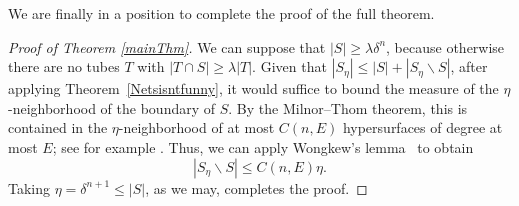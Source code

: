 \documentclass[letterpaper, reqno, 11pt]{amsart}
\theoremstyle{remark}
\numberwithin{equation}{section}
\begin{document}
We are finally in a position to complete the proof of the full theorem.




\begin{proof}[Proof of Theorem \ref{mainThm}]
 We can suppose that  $|S| \geq \lambda\delta^n$, because otherwise there are
no tubes $T$ with $|T \cap S| \geq \lambda |T|$. Given that $|S_\eta|\le |S|+ |S_{\eta} \backslash  S|$, after applying Theorem~\ref{Netsisntfunny}, it would suffice to bound the measure of  the $\eta$-neighborhood of the boundary of $S$. By the Milnor--Thom theorem,  this is contained in the $\eta$-neighborhood of at most $C(n,E)$ hypersurfaces of degree at most $E$; see for example \cite[Theorem 9]{HRR}. Thus, we can apply Wongkew's lemma~\cite{Wo} to obtain
$$|S_{\eta} \backslash  S| \le C(n,E)\eta.$$
Taking $\eta=\delta^{{n+1}}\le|S|$, as we may, completes the proof.
\end{proof}
\end{document}
